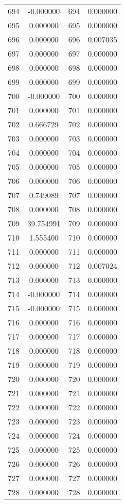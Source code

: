 \documentclass[12pt]{article}
\begin{document}
\begin{longtable}{@{}cccc@{}}
694 & -0.000000 & 694 & 0.000000 \\
695 & 0.000000 & 695 & 0.000000 \\
696 & 0.000000 & 696 & 0.007035 \\
697 & 0.000000 & 697 & 0.000000 \\
698 & 0.000000 & 698 & 0.000000 \\
699 & 0.000000 & 699 & 0.000000 \\
700 & -0.000000 & 700 & 0.000000 \\
701 & 0.000000 & 701 & 0.000000 \\
702 & 0.666729 & 702 & 0.000000 \\
703 & 0.000000 & 703 & 0.000000 \\
704 & 0.000000 & 704 & 0.000000 \\
705 & 0.000000 & 705 & 0.000000 \\
706 & 0.000000 & 706 & 0.000000 \\
707 & 0.749089 & 707 & 0.000000 \\
708 & 0.000000 & 708 & 0.000000 \\
709 & 39.754991 & 709 & 0.000000 \\
710 & 1.555400 & 710 & 0.000000 \\
711 & 0.000000 & 711 & 0.000000 \\
712 & 0.000000 & 712 & 0.007024 \\
713 & 0.000000 & 713 & 0.000000 \\
714 & -0.000000 & 714 & 0.000000 \\
715 & -0.000000 & 715 & 0.000000 \\
716 & 0.000000 & 716 & 0.000000 \\
717 & 0.000000 & 717 & 0.000000 \\
718 & 0.000000 & 718 & 0.000000 \\
719 & 0.000000 & 719 & 0.000000 \\
720 & 0.000000 & 720 & 0.000000 \\
721 & 0.000000 & 721 & 0.000000 \\
722 & 0.000000 & 722 & 0.000000 \\
723 & 0.000000 & 723 & 0.000000 \\
724 & 0.000000 & 724 & 0.000000 \\
725 & 0.000000 & 725 & 0.000000 \\
726 & 0.000000 & 726 & 0.000000 \\
727 & 0.000000 & 727 & 0.000000 \\
728 & 0.000000 & 728 & 0.000000 \\

\end{longtable}
\end{document}
